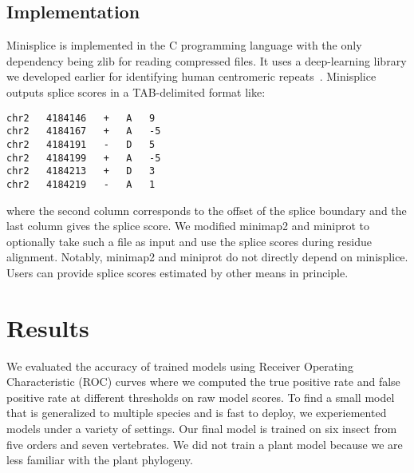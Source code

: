 \documentclass[webpdf,contemporary,large,namedate]{oup-authoring-template}%
\begin{document}
\subsection{Implementation}

Minisplice is implemented in the C programming language with the only dependency
being zlib for reading compressed files.
It uses a deep-learning library we developed earlier for identifying human centromeric repeats~\citep{Li:2019aa}.
Minisplice outputs splice scores in a TAB-delimited format like:
\begin{verbatim}
chr2   4184146   +   A   9
chr2   4184167   +   A   -5
chr2   4184191   -   D   5
chr2   4184199   +   A   -5
chr2   4184213   +   D   3
chr2   4184219   -   A   1
\end{verbatim}
where the second column corresponds to the offset of the splice boundary
and the last column gives the splice score.
We modified minimap2 and miniprot to optionally take such a file as input
and use the splice scores during residue alignment.
Notably, minimap2 and miniprot do not directly depend on minisplice.
Users can provide splice scores estimated by other means in principle.

%

\section{Results}

We evaluated the accuracy of trained models using Receiver Operating Characteristic (ROC) curves
where we computed the true positive rate and false positive rate at different thresholds on raw model scores.
To find a small model that is generalized to multiple species and is fast to deploy,
we experiemented models under a variety of settings.
Our final model is trained on six insect from five orders and seven vertebrates.
We did not train a plant model because we are less familiar with the plant phylogeny.
\end{document}
